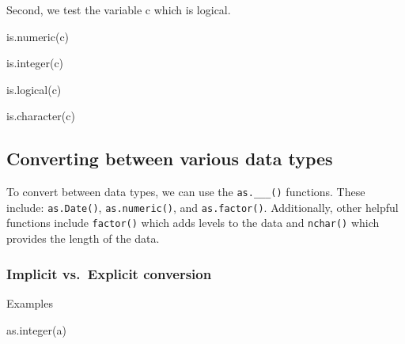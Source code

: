 \documentclass[
  letterpaper,
  DIV=11,
  numbers=noendperiod]{scrreprt}
\newenvironment{Shaded}{}{}
\newcommand{\FunctionTok}[1]{\textcolor[rgb]{0.44,0.26,0.76}{#1}}
\newcommand{\NormalTok}[1]{\textcolor[rgb]{0.14,0.16,0.18}{#1}}
\begin{document}
Second, we test the variable c which is logical.

\begin{Shaded}
\begin{Highlighting}[]
\FunctionTok{is.numeric}\NormalTok{(c)}
\end{Highlighting}
\end{Shaded}

\begin{Shaded}
\begin{Highlighting}[]
\FunctionTok{is.integer}\NormalTok{(c)}
\end{Highlighting}
\end{Shaded}

\begin{Shaded}
\begin{Highlighting}[]
\FunctionTok{is.logical}\NormalTok{(c)}
\end{Highlighting}
\end{Shaded}

\begin{Shaded}
\begin{Highlighting}[]
\FunctionTok{is.character}\NormalTok{(c)}
\end{Highlighting}
\end{Shaded}

\subsection{Converting between various data
types}\label{converting-between-various-data-types}

To convert between data types, we can use the \texttt{as.\_\_\_()}
functions. These include: \texttt{as.Date()}, \texttt{as.numeric()}, and
\texttt{as.factor()}. Additionally, other helpful functions include
\texttt{factor()} which adds levels to the data and \texttt{nchar()}
which provides the length of the data.

\subsubsection{Implicit vs.~Explicit
conversion}\label{implicit-vs.-explicit-conversion}

Examples

\begin{Shaded}
\begin{Highlighting}[]
\FunctionTok{as.integer}\NormalTok{(a)}
\end{Highlighting}
\end{Shaded}
\end{document}
